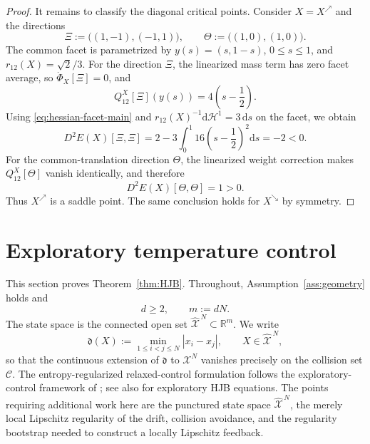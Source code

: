 \documentclass[11pt]{article}
\def\R{\mathbb{R}}
\def\Xc{{\mathcal X}}
\def\hX{\widehat{\Xc}^{\,N}}
\newcommand{\dd}{\mathrm{d}}
\newcommand{\HH}{\mathcal H}
\newcommand{\Coll}{\mathscr C}
\theoremstyle{definition}
\theoremstyle{remark}
\numberwithin{equation}{section}
\begin{document}
\begin{proof}
It remains to classify the diagonal critical points.  Consider
$X=X^{\nearrow}$ and the directions
\[
 \Xi:=\bigl((1,-1),(-1,1)\bigr),
 \qquad
 \Theta:=\bigl((1,0),(1,0)\bigr).
\]
The common facet is parametrized by $y(s)=(s,1-s)$, $0\le s\le1$, and
$r_{12}(X)=\sqrt2/3$.  For the direction $\Xi$, the linearized mass term has zero facet average,
so $\dot\Phi_X[\Xi]=0$, and
\[
 Q_{12}^X[\Xi](y(s))=4\left(s-\frac12\right).
\]
Using \eqref{eq:hessian-facet-main} and
$r_{12}(X)^{-1}\dd\HH^1=3\,\dd s$ on the facet, we obtain
\[
 D^2E(X)[\Xi,\Xi]
 =2-3\int_0^1 16\left(s-\frac12\right)^2\dd s
 =-2<0.
\]
For the common-translation direction $\Theta$, the linearized weight correction makes
$Q_{12}^X[\Theta]$ vanish identically, and therefore
\[
 D^2E(X)[\Theta,\Theta]=1>0.
\]
Thus $X^{\nearrow}$ is a saddle point.  The same conclusion holds for $X^{\searrow}$ by symmetry.
\end{proof}


\section{Exploratory temperature control}\label{sec:control}
This section proves Theorem~\ref{thm:HJB}.  Throughout, Assumption~\ref{ass:geometry} holds and
\begin{equation}\label{eq:d-ge-2}
 d\ge2,
 \qquad
 m:=dN.
\end{equation}
The state space is the connected open set $\hX\subset\R^m$.  We write
\begin{equation}\label{eq:separation-control}
 \mathfrak d(X):=\min_{1\le i<j\le N}|x_i-x_j|,
 \qquad X\in\hX,
\end{equation}
so that the continuous extension of $\mathfrak d$ to $\Xc^N$ vanishes precisely on the collision
set $\Coll$.
The entropy-regularized relaxed-control formulation follows the exploratory-control framework of
\cite{WangZariphopoulouZhou2020,GaoXuZhou2022}; see also
\cite{TangZhangZhou2022} for exploratory HJB equations.  The points requiring additional work here
are the punctured state space $\hX$, the merely local Lipschitz regularity of the drift, collision
avoidance, and the regularity bootstrap needed to construct a locally Lipschitz feedback.
\end{document}
